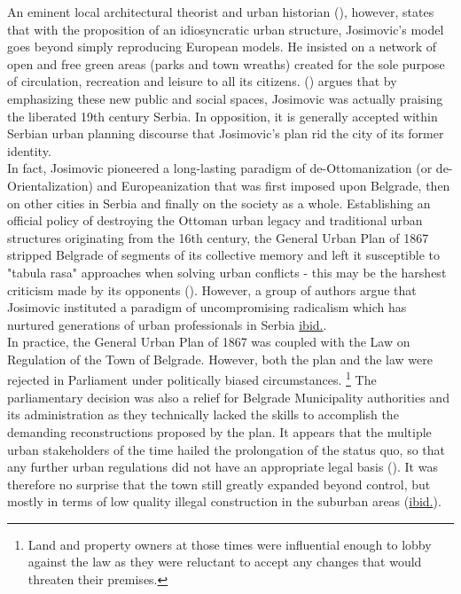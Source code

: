 \documentclass[11pt]{report}
\begin{document}
An eminent local architectural theorist and urban historian (\href{Blagojevic}{\citealt{blagojevic_urban_2009}}), however, states that with the proposition of an idiosyncratic urban structure, Josimovic's model goes beyond simply reproducing European models.
He insisted on a network of open and free green areas (parks and town wreaths) created for the sole purpose of circulation, recreation and leisure to all its citizens. (\href{Blagojevic}{\cite{blagojevic_urban_2009}}) argues that by emphasizing these new public and social spaces, Josimovic was actually praising the liberated 19th century Serbia. In opposition, it is generally accepted within Serbian urban planning discourse that Josimovic’s plan rid the city of its former identity.
\\

In fact,  Josimovic pioneered a long-lasting paradigm of de-Ottomanization (or de-Orientalization) and Europeanization that was first imposed upon Belgrade, then on other cities in Serbia and finally on the society as a whole. Establishing an official policy of destroying the Ottoman urban legacy and traditional urban structures originating from the 16th century, the General Urban Plan of 1867 stripped Belgrade of segments of its collective memory and left it susceptible to "tabula rasa" approaches when solving urban conflicts - this may be the harshest criticism made by its opponents  (\href{Doytchinov}{\citealt{doytchinov_modernization_2015}}).
However, a group of authors argue that Josimovic instituted a paradigm of uncompromising radicalism which has nurtured generations of urban professionals in Serbia \href{ref}{ibid.}.
\\

In  practice,  the General  Urban  Plan  of  1867  was  coupled  with  the  Law  on  Regulation  of the  Town  of  Belgrade.    However,  both  the  plan  and  the  law  were  rejected  in  Parliament under politically biased circumstances.
\footnote{Land and property owners at those times were influential enough to lobby against the law as they were reluctant to accept any changes that would threaten their premises.}
The parliamentary decision was also a relief for Belgrade Municipality authorities and its administration as they technically lacked the skills to accomplish the demanding reconstructions proposed by the plan. It appears that the multiple urban stakeholders of the time hailed the prolongation of the status quo, so that any further urban regulations did not have an appropriate legal basis (\href{Doytchinov}{\citealt{doytchinov_modernization_2015}}). It was therefore no surprise that the town still greatly expanded beyond control, but mostly in terms of low quality illegal construction in the suburban areas (\href{ref}{ibid.}).
\\
\end{document}
